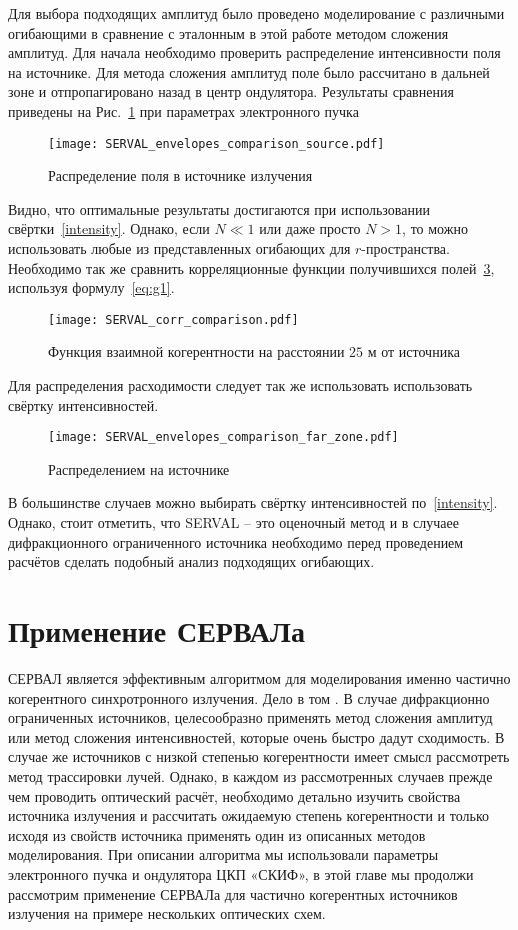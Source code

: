 Для выбора подходящих амплитуд было проведено моделирование с различными огибающими в сравнение с эталонным в этой работе методом сложения амплитуд. Для начала необходимо проверить распределение интенсивности поля на источнике. Для метода сложения амплитуд поле было рассчитано в дальней зоне и отпропагировано назад в центр ондулятора. Результаты сравнения приведены на Рис.~\ref{fig:SERVAL_envelopes_comparison_far_zone} при параметрах электронного пучка 
\begin{figure}[H] 
	\centering 	\texttt{[image: SERVAL\_envelopes\_comparison\_source.pdf]}
	\caption{Распределение поля в источнике излучения}
	\label{fig:SERVAL_envelopes_comparison_far_zone}
\end{figure}
Видно, что оптимальные результаты достигаются при использовании свёртки~\ref{intensity}. Однако, если $N \ll 1$ или даже просто $N > 1$, то можно использовать любые из представленных огибающих для $r$-пространства. Необходимо так же сравнить корреляционные функции получившихся полей~\ref{fig:diff_coh_incoh_rad}, используя формулу~\ref{eq:g1}.
\begin{figure}[H] 
	\centering 	\texttt{[image: SERVAL\_corr\_comparison.pdf]}
	\caption{Функция взаимной когерентности на расстоянии $25$ м от источника}
	\label{fig:SERVAL_corr_comparison}
\end{figure}
Для распределения расходимости следует так же использовать использовать свёртку интенсивностей.
\begin{figure}[H] 
	\centering 	\texttt{[image: SERVAL\_envelopes\_comparison\_far\_zone.pdf]}
	\caption{Распределением на источнике}
	\label{fig:diff_coh_incoh_rad}
\end{figure}
В большинстве случаев можно выбирать свёртку интенсивностей по~\ref{intensity}. Однако, стоит отметить, что SERVAL -- это оценочный метод и в случаее дифракционного ограниченного источника необходимо перед проведением расчётов сделать подобный анализ подходящих огибающих. 

\chapter{Применение СЕРВАЛа}
СЕРВАЛ является эффективным алгоритмом для моделирования именно частично когерентного синхротронного излучения. Дело в том . В случае дифракционно ограниченных источников, целесообразно применять метод сложения амплитуд или метод сложения интенсивностей, которые очень быстро дадут сходимость. В случае же источников с низкой степенью когерентности имеет смысл рассмотреть метод трассировки лучей. Однако, в каждом из рассмотренных случаев прежде чем проводить оптический расчёт, необходимо детально изучить свойства источника излучения и рассчитать ожидаемую степень когерентности и только исходя из свойств источника применять один из описанных методов моделирования. При описании алгоритма мы использовали параметры электронного пучка и ондулятора ЦКП «СКИФ», в этой главе мы продолжи рассмотрим применение СЕРВАЛа для частично когерентных источников излучения на примере нескольких оптических схем.

